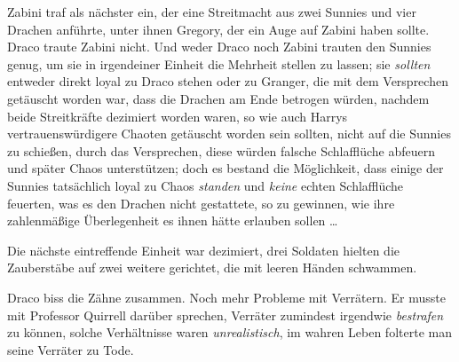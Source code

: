 Zabini traf als nächster ein, der eine Streitmacht aus zwei Sunnies und vier Drachen anführte, unter ihnen Gregory, der ein Auge auf Zabini haben sollte. Draco traute Zabini nicht. Und weder Draco noch Zabini trauten den Sunnies genug, um sie in irgendeiner Einheit die Mehrheit stellen zu lassen; sie \emph{sollten} entweder direkt loyal zu Draco stehen oder zu Granger, die mit dem Versprechen getäuscht worden war, dass die Drachen am Ende betrogen würden, nachdem beide Streitkräfte dezimiert worden waren, so wie auch Harrys vertrauenswürdigere Chaoten getäuscht worden sein sollten, nicht auf die Sunnies zu schießen, durch das Versprechen, diese würden falsche Schlafflüche abfeuern und später Chaos unterstützen; doch es bestand die Möglichkeit, dass einige der Sunnies tatsächlich loyal zu Chaos \emph{standen} und \emph{keine} echten Schlafflüche feuerten, was es den Drachen nicht gestattete, so zu gewinnen, wie ihre zahlenmäßige Überlegenheit es ihnen hätte erlauben sollen …

Die nächste eintreffende Einheit war dezimiert, drei Soldaten hielten die Zauberstäbe auf zwei weitere gerichtet, die mit leeren Händen schwammen.

Draco biss die Zähne zusammen. Noch mehr Probleme mit Verrätern. Er musste mit Professor Quirrell darüber sprechen, Verräter zumindest irgendwie \emph{bestrafen} zu können, solche Verhältnisse waren \emph{unrealistisch}, im wahren Leben folterte man seine Verräter zu Tode.

